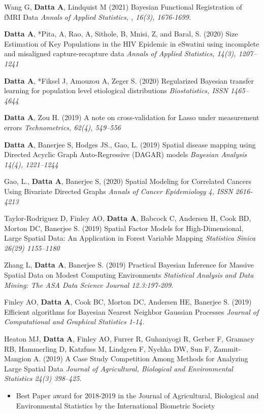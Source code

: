\documentclass[12pt]{article}
\newcommand{\mine}{
  \addtocounter{enumi}{1}
\item[\fcolorbox{white}{grey}{\color{white} \tiny \arabic{enumi}}]
}
\begin{document}
\item Wang G, \textbf{Datta A}, Lindquist M (2021) {Bayesian Functional Registration of fMRI Data} {\it Annals of Applied Statistics, , 16(3), 1676-1699.}

\mine \textbf{Datta A}, *Pita, A, Rao, A, Sithole, B, Mnisi, Z, and Baral, S. (2020)	{Size Estimation of Key Populations in the HIV Epidemic in eSwatini using incomplete and misaligned capture-recapture data} {\it Annals of Applied Statistics, 14(3), 1207--1241 }

\mine \textbf{Datta A}, *Fiksel J, Amouzou A, Zeger S. (2020) {Regularized Bayesian transfer learning for population level etiological
	distributions} {\it Biostatistics, ISSN 1465--4644}
\mine \textbf{Datta A}, Zou H. (2019) {A note on cross-validation for Lasso under measurement
	errors} {\it Technometrics, 62(4), 549--556 }

\mine \textbf{Datta A}, Banerjee S, Hodges JS., Gao, L. (2019)  {Spatial disease mapping using
	Directed Acyclic Graph Auto-Regressive (DAGAR) models} {\it Bayesian Analysis 14(4), 1221--1244}
\item Gao, L., \textbf{Datta A}, Banerjee S, (2020) {Spatial Modeling for Correlated Cancers Using Bivariate Directed Graphs} {\it Annals of Cancer Epidemiology 	4, ISSN 2616-4213}

\item Taylor-Rodriguez D, Finley AO, \textbf{Datta A}, Babcock C, Andersen H, Cook BD,
Morton DC, Banerjee S. (2019)
{Spatial Factor Models for High-Dimensional, Large Spatial Data: An Application in Forest Variable Mapping}
{\it Statistica Sinica 26(29) 1155--1180}

\item Zhang L, \textbf{Datta A}, Banerjee S. (2019) {Practical Bayesian Inference for Massive Spatial Data on Modest Computing Environments}
{\it Statistical Analysis and Data Mining: The ASA Data Science Journal 12.3:197-209.}

\item Finley AO, \textbf{Datta A}, Cook BC, Morton DC, Andersen HE, Banerjee S. (2019)
{Efficient algorithms for Bayesian Nearest Neighbor Gaussian Processes}
{\it  Journal of Computational and Graphical Statistics 1-14.}

\item  Heaton MJ, \textbf{Datta A}, Finley AO, Furrer R, Guhaniyogi R, Gerber F, Gramacy RB, Hammerling D, Katzfuss M, Lindgren F, Nychka DW, Sun F, Zammit-Mangion A. (2019)
{A Case Study Competition Among Methods for Analyzing Large Spatial Data}
{\it Journal of Agricultural, Biological and Environmental Statistics 24(3) 398--425.}
\begin{itemize}
	\item Best Paper award for 2018-2019 in the Journal of Agricultural, Biological and Environmental Statistics by the International Biometric Society
\end{itemize}
\end{document}
